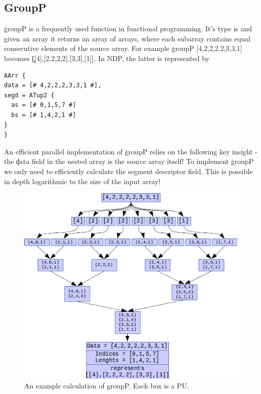   \subsection{GroupP}
    \c{groupP} is a frequently used function in functional programming.
    It's type is \type{[:a:] -> [:[:a:]:]} and given an array it returns an array of arrays,
    where each subarray contains equal consecutive
    elements of the source array. For example
    \c{groupP [4,2,2,2,2,3,3,1]} becomes \c{[[4],[2,2,2,2],[3,3],[1]]}.
    In NDP, the latter is represented by
    \begin{lstlisting}
AArr {
data = [# 4,2,2,2,3,3,1 #],
segd = ATup2 {
  as = [# 0,1,5,7 #]
  bs = [# 1,4,2,1 #]
}
}
    \end{lstlisting}
    An efficient parallel implementation of \c{groupP}
    relies on the following key insight - the \c{data} field in the nested array
    is the source array itself! To implement \c{groupP} we only
    need to efficiently calculate the segment descriptor field. This is
    possible in depth logarithmic to the size of the input array!
    
    \begin{figure}[h!]
        \begin{center}
        \includegraphics[width=\linewidth]{groupP.png}
        \caption{An example calculation of groupP. Each box is a PU.}
        \label{figure:groupP}
        \end{center}
    \end{figure}
    
